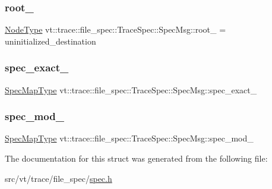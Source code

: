 \subsubsection{\texorpdfstring{root\+\_\+}{root\_}}
{\footnotesize\ttfamily \hyperlink{namespacevt_a866da9d0efc19c0a1ce79e9e492f47e2}{Node\+Type} vt\+::trace\+::file\+\_\+spec\+::\+Trace\+Spec\+::\+Spec\+Msg\+::root\+\_\+ = uninitialized\+\_\+destination}

\mbox{\label{structvt_1_1trace_1_1file__spec_1_1_trace_spec_1_1_spec_msg_a9429b0c5d1d8377bd4bee3d85d0c2456}} 
\subsubsection{\texorpdfstring{spec\+\_\+exact\+\_\+}{spec\_exact\_}}
{\footnotesize\ttfamily \hyperlink{structvt_1_1trace_1_1file__spec_1_1_trace_spec_a155d6b881e8d69a4644823789788ce5c}{Spec\+Map\+Type} vt\+::trace\+::file\+\_\+spec\+::\+Trace\+Spec\+::\+Spec\+Msg\+::spec\+\_\+exact\+\_\+}

\mbox{\label{structvt_1_1trace_1_1file__spec_1_1_trace_spec_1_1_spec_msg_a6857f603118b595c04ce28caf1ffb779}} 
\subsubsection{\texorpdfstring{spec\+\_\+mod\+\_\+}{spec\_mod\_}}
{\footnotesize\ttfamily \hyperlink{structvt_1_1trace_1_1file__spec_1_1_trace_spec_a155d6b881e8d69a4644823789788ce5c}{Spec\+Map\+Type} vt\+::trace\+::file\+\_\+spec\+::\+Trace\+Spec\+::\+Spec\+Msg\+::spec\+\_\+mod\+\_\+}



The documentation for this struct was generated from the following file\+:\begin{DoxyCompactItemize}
\item 
src/vt/trace/file\+\_\+spec/\hyperlink{spec_8h}{spec.\+h}\end{DoxyCompactItemize}
